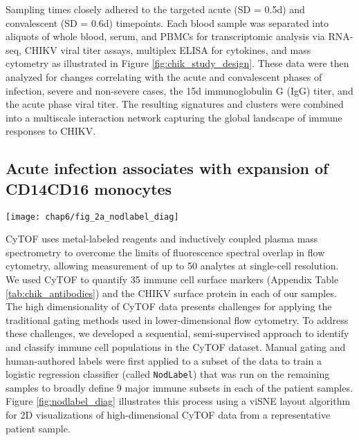 Sampling times closely adhered to the targeted acute (SD = 0.5d) and convalescent (SD = 0.6d) timepoints. Each blood sample was separated into aliquots of whole blood, serum, and PBMCs for transcriptomic analysis via RNA-seq, CHIKV viral titer assays, multiplex ELISA for cytokines, and mass cytometry as illustrated in Figure \ref{fig:chik_study_design}. These data were then analyzed for changes correlating with the acute and convalescent phases of infection, severe and non-severe cases, the 15d immunoglobulin G (IgG) titer, and the acute phase viral titer. The resulting signatures and clusters were combined into a multiscale interaction network capturing the global landscape of immune responses to CHIKV.

\subsection{Acute infection associates with expansion of CD14\sups{+}\allowbreak CD16\sups{+} monocytes}

\begin{figure*}[htb]
  \texttt{[image: chap6/fig\_2a\_nodlabel\_diag]}
  \caption[Overview of the NodLabel procedure]{\textbf{Overview of the NodLabel procedure}, using a viSNE layout of CyTOF single-cell events. Left side, point color indicates channel values for four example channels. Right side, traditional hierarchical gating was used on a subset of samples to identify 9 major immune compartments, which was then used to train a logistic regression classifier (Nod) that applied labels for canonical leukocyte phenotypes to all samples (NodLabel).
  }
  \label{fig:nodlabel_diag}
\end{figure*}

CyTOF uses metal-labeled reagents and inductively coupled plasma mass spectrometry to overcome the limits of fluorescence spectral overlap in flow cytometry, allowing measurement of up to 50 analytes at single-cell resolution. We used CyTOF to quantify 35 immune cell surface markers (Appendix Table \ref{tab:chik_antibodies}) and the CHIKV surface protein in each of our samples. The high dimensionality of CyTOF data presents challenges for applying the traditional gating methods used in lower-dimensional flow cytometry. To address these challenges, we developed a sequential, semi-supervised approach to identify and classify immune cell populations in the CyTOF dataset. Manual gating and human-authored labels were first applied to a subset of the data to train a logistic regression classifier (called \texttt{NodLabel}) that was run on the remaining samples to broadly define 9 major immune subsets in each of the patient samples. Figure \ref{fig:nodlabel_diag} illustrates this process using a viSNE layout algorithm\autocite{Amir2013} for 2D visualizations of high-dimensional CyTOF data from a representative patient sample.

